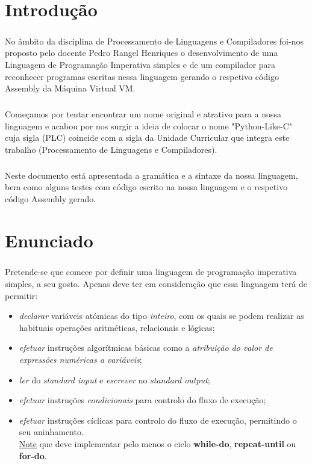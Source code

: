\documentclass[11pt,a4paper]{report}
\begin{document}
    \tableofcontents

    \pagebreak


    \chapter{Introdução}
    \paragraph{}
    No âmbito da disciplina de Processamento de Linguagens e Compiladores foi-nos proposto pelo docente Pedro Rangel Henriques o desenvolvimento de uma Linguagem de Programação Imperativa simples e de um compilador para reconhecer programas escritas nessa linguagem gerando o respetivo código Assembly da Máquina Virtual VM.
    \paragraph{}
    Começamos por tentar encontrar um nome original e atrativo para a nossa linguagem e acabou por nos surgir a ideia de colocar o nome "Python-Like-C" cuja sigla (PLC) coincide com a sigla da Unidade Curricular que integra este trabalho (Processamento de Linguagens e Compiladores).
    \paragraph{}
    Neste documento está apresentada a gramática e a sintaxe da nossa linguagem, bem como alguns testes com código escrito na nossa linguagem e o respetivo código Assembly gerado.


    \chapter{Enunciado}
    \paragraph{}
    Pretende-se que comece por definir uma linguagem de programação imperativa simples, a seu gosto.
    Apenas deve ter em consideração que essa linguagem terá de permitir:
    \begin{itemize}
        \item \textit{declarar} variáveis atómicas do tipo \textit{inteiro}, com os quais se podem realizar as habituais operações aritméticas, relacionais e lógicas;
        \item \textit{efetuar} instruções algorítmicas básicas como a \textit{atribuição do valor de expressões numéricas a variáveis};
        \item \textit{ler} do \textit{standard input} e \textit{escrever} no \textit{standard output};
        \item \textit{efetuar} instruções \textit{condicionais} para controlo do fluxo de execução;
        \item \textit{efetuar} instruções cíclicas para controlo do fluxo de execução, permitindo o seu aninhamento.\\
    \underline{Note} que deve implementar pelo menos o ciclo \textbf{while-do}, \textbf{repeat-until} ou \textbf{for-do}.
    \end{itemize}
\end{document}
